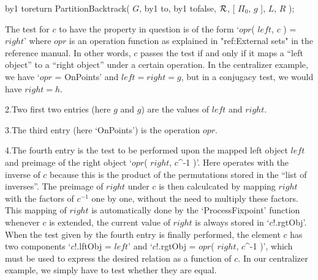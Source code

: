 {\parskip 0pt \newcount\lineno%
 \def\){\advance\lineno by1 \begingroup\obeylines\cloparen%
        \hbox to\manindent{\hfil $\scriptstyle\the\lineno$\enspace}}%
\)return PartitionBacktrack( $G$,
\)\quad [ $g$, $g$,
\)\qquad OnPoints,
\)\qquad $c$ -> $c$!.lftObj = $c$!.rgtObj ],
\)\quad false, $\cal R$, [ $\Pi_0$, $g$ ], $L$, $R$ );
  \vadjust{\allowbreak}%

}%
The test for $c$ to have the property in question  is of the form `$opr$(
$left$,  $c$  )  =  $right$' where  $opr$   is an  operation  function as
explained in "ref:External sets" in the reference manual. In other words,
$c$ passes the test if and only if it maps a ``left object'' to a ``right
object'' under  a certain operation. In  the centralizer example, we have
`$opr$ =  OnPoints' and $left = right  = g$, but  in a conjugacy test, we
would have $right = h$.

2.\enspace  Two first two  entries (here $g$ and  $g$)  are the values of
$left$ and $right$.

3.\enspace The third entry (here `OnPoints') is the operation $opr$.

4.\enspace The fourth  entry is the test to  be performed upon the mapped
left object $left$  and preimage  of  the right object `$opr$(   $right$,
$c$^-1 )'.  Here {\GAP} operates with the  inverse of $c$ because this is
the product of  the permutations stored  in the ``list of inverses''. The
preimage of $right$ under $c$ is then calculcated by mapping $right$ with
the factors  of $c^{-1}$ one by one,  without the need  to multiply these
factors.    This mapping  of  $right$  is     automatically done by   the
`ProcessFixpoint' function whenever $c$ is extended, the current value of
$right$ is always  stored  in `$c$!.rgtObj'.  When the test  given by the
fourth entry  is finally performed,   the element $c$  has two components
`$c$!.lftObj =  $left$' and `$c$!.rgtObj  =   $opr$( $right$, $c$^-1  )',
which must be used to express the desired  relation as a function of $c$.
In our  centralizer  example, we simply  have  to test   whether they are
equal.

